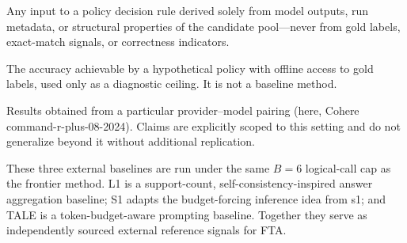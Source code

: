 \begin{description}[leftmargin=2.2cm, labelwidth=2cm, labelsep=0.2cm, style=nextline]
  \item[Gold-free runtime feature] Any input to a policy decision rule derived
    solely from model outputs, run metadata, or structural properties of the
    candidate pool---never from gold labels, exact-match signals, or
    correctness indicators.
  \item[Oracle upper bound] The accuracy achievable by a hypothetical policy
    with offline access to gold labels, used only as a diagnostic ceiling.
    It is not a baseline method.
  \item[Provider-specific evidence] Results obtained from a particular
    provider--model pairing (here, Cohere command-r-plus-08-2024).
    Claims are explicitly scoped to this setting and do not generalize beyond
    it without additional replication.
\end{description}

These three external baselines are run under the same $B = 6$ logical-call cap
as the frontier method. L1 is a support-count, self-consistency-inspired answer
aggregation baseline; S1 adapts the budget-forcing inference idea from s1; and
TALE is a token-budget-aware prompting baseline. Together they serve as
independently sourced external reference signals for FTA.
